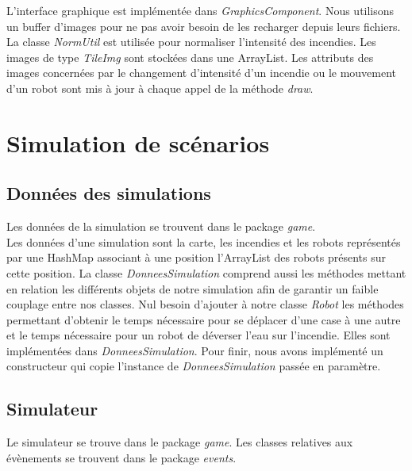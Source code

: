 \documentclass[a4paper, 10pt, french]{article}
\begin{document}
	L'interface graphique est implémentée dans {\it GraphicsComponent}. Nous utilisons un buffer d'images pour ne pas avoir besoin de les recharger depuis leurs fichiers. La classe {\it NormUtil} est utilisée pour normaliser l'intensité des incendies. Les images de type {\it TileImg} sont stockées dans une ArrayList. Les attributs des images concernées par le changement d'intensité d'un incendie ou le mouvement d'un robot sont mis à jour à chaque appel de la méthode {\it draw}.

\section{Simulation de scénarios}

	\subsection{Données des simulations}
	\noindent Les données de la simulation se trouvent dans le package {\it game}. \\

	Les données d'une simulation sont la carte, les incendies et les robots représentés par une HashMap associant à une position l'ArrayList des robots présents sur cette position. La classe {\it DonneesSimulation} comprend aussi les méthodes mettant en relation les différents objets de notre simulation afin de garantir un faible couplage entre nos classes. Nul besoin d'ajouter à notre classe {\it Robot} les méthodes permettant d'obtenir le temps nécessaire pour se déplacer d'une case à une autre et le temps nécessaire pour un robot de déverser l'eau sur l'incendie. Elles sont implémentées dans {\it DonneesSimulation}. Pour finir, nous avons implémenté un constructeur qui copie l'instance de {\it DonneesSimulation} passée en paramètre. 
	
	\subsection{Simulateur}
	\noindent Le simulateur se trouve dans le package {\it game}. Les classes relatives aux évènements se trouvent dans le package {\it events}.\\
\end{document}

